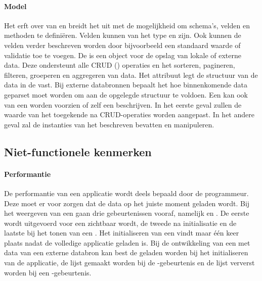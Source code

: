 \paragraph{Model}
Het  erft over van  en breidt het uit met de mogelijkheid om schema's,  velden en methoden te definiëren.  
Velden kunnen van het type  en  zijn.
Ook kunnen de velden verder beschreven worden door bijvoorbeeld een standaard waarde of validatie toe te voegen.
De  is een \kendo{} object voor de opslag van lokale of externe data.  
Deze ondersteunt alle CRUD () operaties en het sorteren, pagineren, filteren, groeperen en aggregeren van data.
Het  attribuut legt de structuur van de data in de  vast.
Bij externe databronnen bepaalt het hoe binnenkomende data geparset moet worden om aan de opgelegde structuur te voldoen.
Een  kan ook van een  worden voorzien of zelf een  beschrijven.
In het eerste geval zullen de waarde van het toegekende  na CRUD-operaties worden aangepast.
In het andere geval zal de  instanties van het beschreven  bevatten en manipuleren.

\subsection{Niet-functionele kenmerken}
\label{sec:kendo-niet-functioneel}

\paragraph{Performantie}
De performantie van een \kendo{} applicatie wordt deels bepaald door de programmeur.
Deze moet er voor zorgen dat de data op het juiste moment geladen wordt.
Bij het weergeven van een  gaan drie gebeurtenissen vooraf,  namelijk  en .
De eerste wordt uitgevoerd voor een  zichtbaar wordt,  de tweede na initialisatie en de laatste bij het tonen van een .
Het initialiseren van een  vindt maar één keer plaats nadat de volledige applicatie geladen is.
Bij de ontwikkeling van een  met data van een externe databron kan best de  geladen worden bij het initialiseren van de applicatie,  de lijst gemaakt worden bij de -gebeurtenis en de lijst ververst worden bij een -gebeurtenis.

